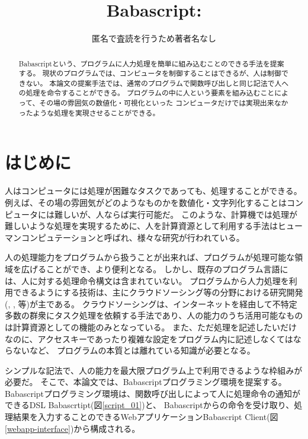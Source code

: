 \title{Babascript: }


\author{匿名で査読を行うため著者名なし
  }

\begin{abstract}

Babascriptという、プログラムに人力処理を簡単に組み込むことのできる手法を提案する。
現状のプログラムでは、コンピュータを制御することはできるが、人は制御できない。
本論文の提案手法では、通常のプログラムで関数呼び出しと同じ記法で人への処理を命令することができる。
プログラムの中に人という要素を組み込むことによって、その場の雰囲気の数値化・可視化といった
コンピュータだけでは実現出来なかったような処理を実現させることができる。

\end{abstract}

\maketitle

\section{はじめに}\label{ux306fux3058ux3081ux306b}

人はコンピュータには処理が困難なタスクであっても、処理することができる。
例えば、その場の雰囲気がどのようなものかを数値化・文字列化することはコンピュータには難しいが、人ならば実行可能だ。
このような、計算機では処理が難しいような処理を実現するために、人を計算資源として利用する手法はヒューマンコンピュテーション\cite{humancomputation}と呼ばれ、様々な研究が行われている。

人の処理能力をプログラムから扱うことが出来れば、プログラムが処理可能な領域を広げることができ、より便利となる。
しかし、既存のプログラム言語には、人に対する処理命令構文は含まれていない。
プログラムから人力処理を利用できるようにする技術は、主にクラウドソーシング等の分野における研究開発(\cite{automan},
\cite{crowddb}, \cite{crowdforge}等)が主である。
クラウドソーシングは、インターネットを経由して不特定多数の群衆にタスク処理を依頼する手法であり、人の能力のうち活用可能なものは計算資源としての機能のみとなっている。
また、ただ処理を記述したいだけなのに、アクセスキーであったり複雑な設定をプログラム内に記述しなくてはならないなど、
プログラムの本質とは離れている知識が必要となる。

シンプルな記法で、人の能力を最大限プログラム上で利用できるような枠組みが必要だ。
そこで、本論文では、Babascriptプログラミング環境を提案する。
Babascriptプログラミング環境は、関数呼び出しによって人に処理命令の通知ができるDSL
Babascrtipt(図\ref{script_01})と、
Babascriptからの命令を受け取り、処理結果を入力することのできるWebアプリケーションBabascript
Client(図\ref{webapp-interface})から構成される。

